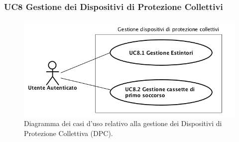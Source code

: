 	\newpage	
	\subsubsection{UC8 Gestione dei Dispositivi di Protezione Collettivi}
		\label{section:UC8}
		\begin{figure}[H]
			\begin{center}
				\includegraphics[width=12cm]{Pics/UC8GestioneDispositiviProtezioneCollettivi.png}
				\caption{Diagramma dei casi d'uso relativo alla gestione dei Dispositivi di Protezione Collettiva (DPC).}
				\label{fig:UC8_DPC}
			\end{center}
		\end{figure}
		
